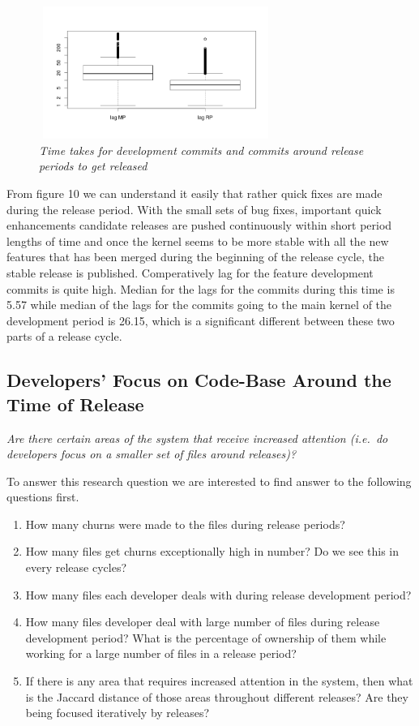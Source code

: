 \documentclass{acm_proc_article-sp}
\begin{document}
\begin{figure}
\begin{center}
\includegraphics[height=1.7in,width=3in]{lagMPRPbox.png}
\caption{\small \sl Time takes for development commits and commits around release periods to get released}
\end{center}
\end{figure}

From figure 10 we can understand it easily that rather quick fixes are made during the release period. With the small sets of bug fixes, important quick enhancements candidate releases are pushed continuously within short period lengths of time and once the kernel seems to be more stable with all the new features that has been merged during the beginning of the release cycle, the stable release is published. Comperatively lag for the feature development commits is quite high. Median for the lags for the commits during this time is 5.57 while median of the lags for the commits going to the main kernel of the development  period is 26.15, which is a significant different between these two parts of a release cycle.

\subsection{Developers' Focus on Code-Base Around the Time of Release}
\textit{Are there certain areas of the system that receive increased attention (i.e.\ do developers focus on a smaller set of files around releases)?}

To answer this research question we are interested to find answer to the following questions first.
\renewcommand{\labelenumi}{q\theenumi:}
\begin{enumerate}
\item{How many churns were made to the files during release periods?}
\item{How many files get churns exceptionally high in number? Do we see this in every release cycles?}
\item{How many files each developer deals with during release development period?}
\item{How many files developer deal with large number of files during release development period? What is the percentage of ownership of them while working for a large number of files in a release period?}
\item{If there is any area that requires increased attention in the system, then what is the Jaccard distance of those areas throughout different releases? Are they being focused iteratively by releases?}
\end{enumerate}
\end{document}
